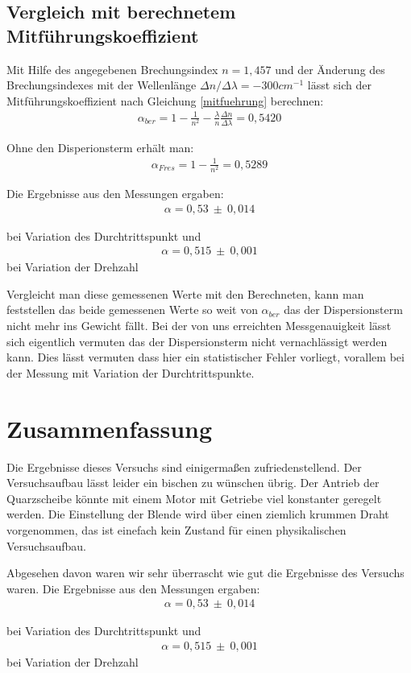 \documentclass[12pt]{article}
\begin{document}
\subsection{Vergleich mit berechnetem Mitführungskoeffizient}
Mit Hilfe des angegebenen Brechungsindex $n=1,457$ und der Änderung des Brechungsindexes mit der Wellenlänge $\Delta n / \Delta\lambda = -300 cm^{-1}$
lässt sich der Mitführungskoeffizient nach Gleichung \ref{mitfuehrung} berechnen:
\begin{align}
 \alpha_{ber} = 1 - \frac{1}{n^2} - \frac{\lambda}{n} \frac{\Delta n}{\Delta \lambda} = 0,5420
\end{align}

Ohne den Disperionsterm erhält man:
\begin{align}
 \alpha_{Fres} = 1 - \frac{1}{n^2} = 0,5289
\end{align}

Die Ergebnisse aus den Messungen ergaben:
\begin{align}
 \alpha = 0,53 \ \pm \ 0,014
\end{align}

bei Variation des Durchtrittspunkt und
\begin{align}
 \alpha = 0,515 \ \pm \ 0,001
\end{align}
bei Variation der Drehzahl

Vergleicht man diese gemessenen Werte mit den Berechneten, kann man feststellen das beide gemessenen Werte so weit von $\alpha_{ber}$
das der Dispersionsterm nicht mehr ins Gewicht fällt. Bei der von uns erreichten Messgenauigkeit lässt sich eigentlich vermuten das der Dispersionsterm
nicht vernachlässigt werden kann. Dies lässt vermuten dass hier ein statistischer Fehler vorliegt, vorallem bei der Messung mit Variation der
Durchtrittspunkte.

\section{Zusammenfassung}
Die Ergebnisse dieses Versuchs sind einigermaßen zufriedenstellend. Der Versuchsaufbau lässt leider ein bischen zu wünschen übrig. Der Antrieb der 
Quarzscheibe könnte mit einem Motor mit Getriebe viel konstanter geregelt werden. Die Einstellung der Blende wird über einen ziemlich krummen
Draht vorgenommen, das ist einefach kein Zustand für einen physikalischen Versuchsaufbau.

Abgesehen davon waren wir sehr überrascht wie gut die Ergebnisse des Versuchs waren.
Die Ergebnisse aus den Messungen ergaben:
\begin{align}
 \alpha = 0,53 \ \pm \ 0,014
\end{align}

bei Variation des Durchtrittspunkt und
\begin{align}
 \alpha = 0,515 \ \pm \ 0,001
\end{align}
bei Variation der Drehzahl
\end{document}
